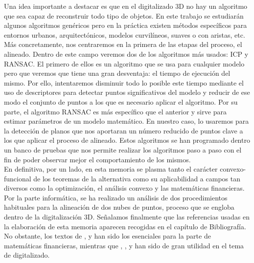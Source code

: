 Una idea importante a destacar es que en el digitalizado 3D no hay un algoritmo que sea capaz de reconstruir todo tipo de objetos. En este trabajo se estudiarán algunos algoritmos genéricos pero en la práctica existen métodos específicos para entornos urbanos, arquitectónicos, modelos curvilíneos, suaves o con aristas, etc. Más concretamente, nos centraremos en la primera de las etapas del proceso, el alineado. Dentro de este campo veremos dos de los algoritmos más usados: ICP y RANSAC. El primero de ellos es un algoritmo que se usa para cualquier modelo pero que veremos que tiene una gran desventaja: el tiempo de ejecución del mismo. Por ello, intentaremos disminuir todo lo posible este tiempo mediante el uso de descriptores para detectar puntos significativos del modelo y reducir de ese modo el conjunto de puntos a los que es necesario aplicar el algoritmo. Por su parte, el algoritmo RANSAC es más específico que el anterior y sirve para estimar parámetros de un modelo matemático. En nuestro caso, lo usaremos para la detección de planos que nos aportaran un número reducido de puntos clave a los que aplicar el proceso de alineado. Estos algoritmos se han programado dentro un banco de pruebas que nos permite realizar los algoritmos paso a paso con el fin de poder observar mejor el comportamiento de los mismos.\\

En definitiva, por un lado, en esta memoria se plasma tanto el carácter convexo-funcional de los teoremas de la alternativa como su aplicabilidad a campos tan diversos como la optimización, el análisis convexo y las matemáticas financieras. Por la parte informática, se ha realizado un análisis de dos procedimientos habituales para la alineación de dos nubes de puntos, proceso que se engloba dentro de la digitalización 3D. Señalamos finalmente que las referencias usadas en la elaboración de esta memoria aparecen recogidas en el capítulo de Bibliografía. No obstante, los textos de \cite{borwein}, \cite{elliot1999mathematics} y \cite{Simons2008} han sido los esenciales para la parte de matemáticas financieras, mientras que \cite{QuatYan}, \cite{ICPBesl}, \cite{fischler1981random} y \cite{QT+Opengl} han sido de gran utilidad en el tema de digitalizado.
